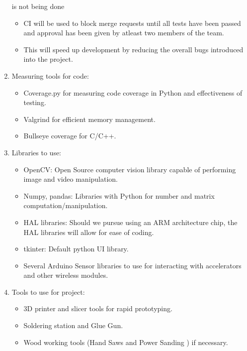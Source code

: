 \documentclass{article}
\begin{document}
\begin{enumerate}
  is not being done
\begin{itemize}
\item CI will be used to block merge requests until all tests have been passed and approval has been given by atleast two members of the team. 
\item This will speed up development by reducing the overall bugs introduced into the project.
\end{itemize}
\item Measuring tools for code:
\begin{itemize}
\item Coverage.py for measuring code coverage in Python and effectiveness of testing.
\item Valgrind for efficient memory management.
\item Bullseye coverage for C/C++.
\end{itemize}
\item Libraries to use:
\begin{itemize}
\item OpenCV: Open Source computer vision library capable of performing image and video manipulation.
\item Numpy, pandas: Libraries with Python for number and matrix computation/manipulation.
\item HAL libraries: Should we pursue using an ARM architecture chip, the HAL libraries will allow for ease of coding.
\item tkinter: Default python UI library.
\item Several Arduino Sensor libraries to use for interacting with accelerators and other wireless modules.
\end{itemize}
\item Tools to use for project:
\begin{itemize}
\item 3D printer and slicer tools for rapid prototyping.
\item Soldering station and Glue Gun.
\item Wood working tools (Hand Saws and Power Sanding ) if necessary.
\end{itemize}
\end{enumerate}
\end{document}
